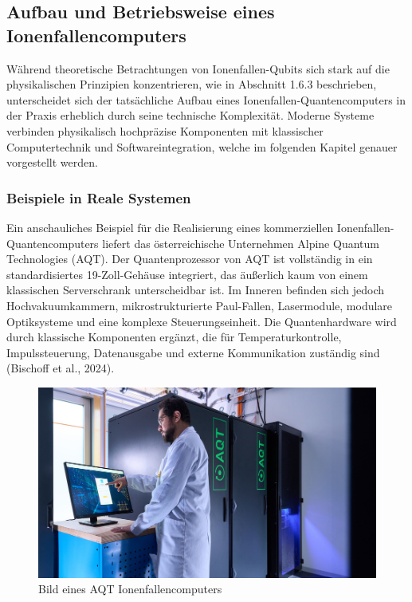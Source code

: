 \subsection{Aufbau und Betriebsweise eines Ionenfallencomputers}

Während theoretische Betrachtungen von Ionenfallen-Qubits sich stark auf die physikalischen Prinzipien konzentrieren, wie in Abschnitt 1.6.3 beschrieben, unterscheidet sich der tatsächliche Aufbau eines Ionenfallen-Quantencomputers in der Praxis erheblich durch seine technische Komplexität. Moderne Systeme verbinden physikalisch hochpräzise Komponenten mit klassischer Computertechnik und Softwareintegration, welche im folgenden Kapitel genauer vorgestellt werden.
\subsubsection{Beispiele in Reale Systemen}

Ein anschauliches Beispiel für die Realisierung eines kommerziellen Ionenfallen-Quantencomputers liefert das österreichische Unternehmen Alpine Quantum Technologies (AQT). Der Quantenprozessor von AQT ist vollständig in ein standardisiertes 19-Zoll-Gehäuse integriert, das äußerlich kaum von einem klassischen Serverschrank unterscheidbar ist. Im Inneren befinden sich jedoch Hochvakuumkammern, mikrostrukturierte Paul-Fallen, Lasermodule, modulare Optiksysteme und eine komplexe Steuerungseinheit. Die Quantenhardware wird durch klassische Komponenten ergänzt, die für Temperaturkontrolle, Impulssteuerung, Datenausgabe und externe Kommunikation zuständig sind (Bischoff et al., 2024).

    \begin{figure}[ht]
    \centering
    \includegraphics[width=1\textwidth]{images/quanten-hardware/AQT.jpg}
    \caption{Bild eines AQT Ionenfallencomputers}
    \label{fig:meinbild}
    \end{figure}

